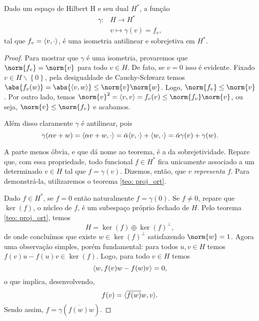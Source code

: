 \begin{teo}
    Dado um espaço de Hilbert H e seu dual \( H^{ * } \), a função
    \begin{align*}
        \gamma : &H \to H^{ * } \\
            &v \mapsto \gamma(v) = f_{ v }
    ,\end{align*}
    tal que \( f_{ v } = \langle v,\cdot\rangle \), é uma isometria antilinear e sobrejetiva em \( H^{ * } \).
\end{teo}
\begin{proof}
    Para mostrar que \( \gamma \) é uma isometria, provaremos que \( \norm{ f_{ v } } = \norm{ v } \) para todo \( v \in H \).
    De fato, se \( v = 0 \) isso é evidente.
    Fixado \( v \in H \backslash \left\{ 0 \right\} \), pela desigualdade de Cauchy-Schwarz temos \( \abs{ f_{ v }(w) } = \abs{ \dotprod{v,w} } \leq \norm{ v } \norm{ w } \).
    Logo, \( \norm{ f_{ v } } \leq \norm{ v } \).
    Por outro lado, temos \( \norm{ v }^2 = \dotprod{v,v} = f_{ v }(v) \leq \norm{ f_{ v } } \norm{ v } \), ou seja, \( \norm{ v } \leq \norm{ f_{ v } } \) e acabamos.

    Além disso claramente \( \gamma \) é antilinear, pois \[
        \gamma (\alpha v + w) = \langle\alpha v + w, \cdot\rangle = \bar{\alpha} \langle v, \cdot\rangle + \langle w,\cdot\rangle = \bar{\alpha} \gamma(v) + \gamma(w)
    .\]

    A parte menos óbvia, e que dá nome ao teorema, é a da sobrejetividade.
    Repare que, com essa propriedade, todo funcional \( f \in H^{ * } \) fica unicamente associado a um determinado \( v \in H \) tal que \( f = \gamma(v) \).
    Dizemos, então, que \( v \) \emph{representa} \( f \).
    Para demonstrá-la, utilizaremos o teorema \ref{teo: proj_ort}.

    Dado \( f \in H^{ * } \), se \( f = 0 \) então naturalmente \( f = \gamma(0) \).
    Se \( f \neq 0 \), repare que \( \ker(f) \), o núcleo de \( f \), é um subespaço próprio fechado de \( H \).
    Pelo teorema \ref{teo: proj_ort}, temos \[
        H = \ker(f) \oplus \ker(f)^{ \perp }
    ,\]
    de onde concluímos que existe \( w \in \ker(f)^{ \perp } \) satisfazendo \( \norm{ w } = 1 \).
    Agora uma observação simples, porém fundamental: para todos \( u, v \in H \) temos \( f(v)u - f(u)v \in \ker(f) \).
    Logo, para todo \( v \in H \) temos \[
        \langle w,f(v)w - f(w)v\rangle = 0
    ,\]
    o que implica, desenvolvendo, \[
        f(v) = \langle\overline{f(w)}w,v\rangle
    .\]
    Sendo assim, \( f = \gamma(\overline{f(w)}w) \).
\end{proof}

